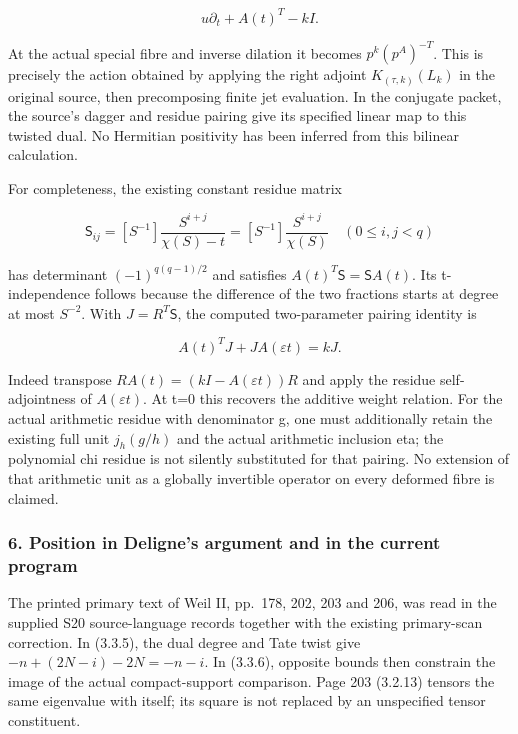 \[
u\partial_t+A(t)^T-kI.
\tag{RW21}
\]

At the actual special fibre and inverse dilation it becomes \(p^k(p^A)^{-T}\). This is precisely the action obtained by applying the right adjoint \(K_{(\tau,k)}(L_k)\) in the original source, then precomposing finite jet evaluation. In the conjugate packet, the source's dagger and residue pairing give its specified linear map to this twisted dual. No Hermitian positivity has been inferred from this bilinear calculation.

For completeness, the existing constant residue matrix

\[
\mathsf S_{ij}=[S^{-1}]\frac{S^{i+j}}{\chi(S)-t}
=[S^{-1}]\frac{S^{i+j}}{\chi(S)}
\quad(0\le i,j<q)
\tag{RW22}
\]

has determinant \((-1)^{q(q-1)/2}\) and satisfies \(A(t)^T\mathsf S=\mathsf SA(t)\). Its t-independence follows because the difference of the two fractions starts at degree at most \(S^{-2}\). With \(J=R^T\mathsf S\), the computed two-parameter pairing identity is

\[
\boxed{A(t)^T J+J A(\varepsilon t)=kJ.}
\tag{RW23}
\]

Indeed transpose \(RA(t)=(kI-A(\varepsilon t))R\) and apply the residue self-adjointness of \(A(\varepsilon t)\). At t=0 this recovers the additive weight relation. For the actual arithmetic residue with denominator g, one must additionally retain the existing full unit \(j_h(g/h)\) and the actual arithmetic inclusion eta; the polynomial chi residue is not silently substituted for that pairing. No extension of that arithmetic unit as a globally invertible operator on every deformed fibre is claimed.

\subsubsection{6. Position in Deligne's argument and in the current program}\label{endpoint-f1_reflection--position-in-delignes-argument-and-in-the-current-program}

The printed primary text of Weil II, pp.~178, 202, 203 and 206, was read in the supplied S20 source-language records together with the existing primary-scan correction. In (3.3.5), the dual degree and Tate twist give \(-n+(2N-i)-2N=-n-i\). In (3.3.6), opposite bounds then constrain the image of the actual compact-support comparison. Page 203 (3.2.13) tensors the same eigenvalue with itself; its square is not replaced by an unspecified tensor constituent.

